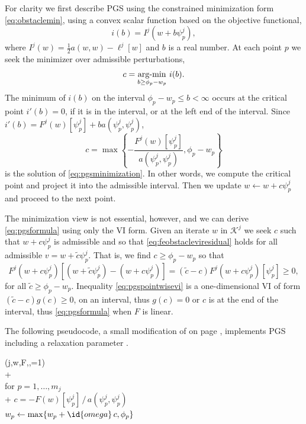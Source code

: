 \documentclass[letterpaper,final,12pt,reqno]{amsart}
\theoremstyle{claim}
\numberwithin{equation}{section}
\numberwithin{figure}{section}
\numberwithin{table}{section}
\numberwithin{theorem}{section}
\begin{document}
For clarity we first describe PGS using the constrained minimization form \eqref{eq:obstaclemin}, using a convex scalar function based on the objective functional,
\begin{equation}
i(b) = I^j(w+b\psi_p^j),
\end{equation}
where $I^j(w) = \frac{1}{2} a(w,w) - \ell^j[w]$ and $b$ is a real number.  At each point $p$ we seek the minimizer over admissible perturbations,
\begin{equation}
  c = \mathop{\mathrm{arg\text{-}min}}_{b \ge \phi_p - w_p} \, i(b).  \label{eq:pgsminimization}
\end{equation}
The minimum of $i(b)$ on the interval $\phi_p - w_p \le b < \infty$ occurs at the critical point $i'(b)=0$, if it is in the interval, or at the left end of the interval.  Since $i'(b) = F^j(w)[\psi_p^j] + b a(\psi_p^j,\psi_p^j)$,
\begin{equation}
  c = \max\left\{-\frac{F^j(w)[\psi_p^j]}{a(\psi_p^j,\psi_p^j)}, \phi_p - w_p\right\}  \label{eq:pgsformula}
\end{equation}
is the solution of \eqref{eq:pgsminimization}.  In other words, we compute the critical point and project it into the admissible interval.  Then we update $w \gets w + c\psi_p^j$ and proceed to the next point.

The minimization view is not essential, however, and we can derive \eqref{eq:pgsformula} using only the VI form.  Given an iterate $w$ in $\mathcal{K}^j$ we seek $c$ such that $w+c\psi_p^j$ is admissible and so that \eqref{eq:feobstacleviresidual} holds for all admissible $v=w+\tilde c\psi_p^j$.  That is, we find $c\ge \phi_p-w_p$ so that
\begin{equation}
  F^j(w+c\psi_p^j)[(w+\tilde c\psi_p^j) - (w+c\psi_p^j)] = (\tilde c - c) F^j(w+c\psi_p^j)[\psi_p^j] \ge 0,  \label{eq:pgspointwisevi}
\end{equation}
for all $\tilde c\ge \phi_p-w_p$.  Inequality \eqref{eq:pgspointwisevi} is a one-dimensional VI of form $(\tilde c - c)g(c) \ge 0$, on an interval, thus $g(c)=0$ or $c$ is at the end of the interval, thus \eqref{eq:pgsformula} when $F$ is linear.

The following pseudocode, a small modification of  on page \pageref{ps:gs-sweep}, implements PGS including a relaxation parameter .
\begin{pseudo*} \label{ps:pgs-sweep}
(j,w,F,\phi,=1)\text{:} \\+
     \\
    for $p=1,\dots,m_j$ \\+
        $c = -F(w)[\psi_p^j] \,\big/\, a(\psi_p^j,\psi_p^j)$ \\
        $w_p \gets \max\{w_p + \id{omega}\,c, \phi_p\}$
\end{pseudo*}
\end{document}
